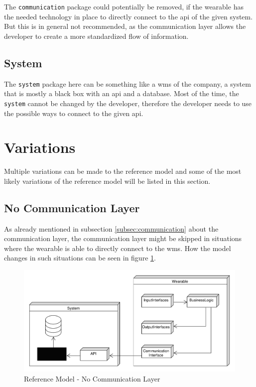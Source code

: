 The \texttt{communication} package could potentially be removed, if the wearable has the needed technology in place to directly connect to the \gls{api} of the given system. But this is in general not recommended, as the communication layer allows the developer to create a more standardized flow of information.

\subsection{System}
The \texttt{system} package here can be something like a \gls{wms} of the company, a system that is mostly a black box with an \gls{api} and a database. Most of the time, the \texttt{system} cannot be changed by the developer, therefore the developer needs to use the possible ways to connect to the given \gls{api}.

\section{Variations}
Multiple variations can be made to the reference model and some of the most likely variations of the reference model will be listed in this section.

\subsection{No Communication Layer}
As already mentioned in subsection \ref{subsec:communication} about the communication layer, the communication layer might be skipped in situations where the wearable is able to directly connect to the \gls{wms}. How the model changes in such situations can be seen in figure \ref{fig:referenceModel_NoCommunication}. 

\begin{figure}[H]
	\begin{center}	
	\includegraphics[width=\linewidth]{images/PackageModel_ReferenceArchitecture_NoCommunication}	
	\end{center}
	\caption{Reference Model - No Communication Layer}
	\label{fig:referenceModel_NoCommunication}
\end{figure}

